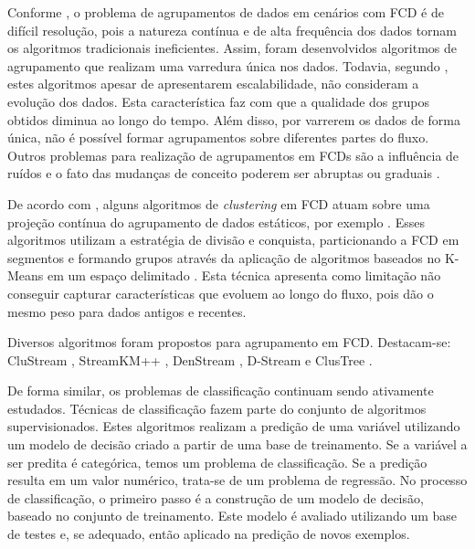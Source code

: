 \documentclass[qual, classic, a4paper]{ufbathesis}
\begin{document}
Conforme \cite{Aggarwal:2003:FCE:1315451.1315460}, o problema de agrupamentos de dados em cenários com FCD é de difícil resolução,
pois a natureza contínua e de alta frequência dos dados tornam os algoritmos tradicionais ineficientes.
Assim, foram desenvolvidos algoritmos de agrupamento que realizam uma varredura única nos dados. 
Todavia, segundo \cite{Aggarwal:2003:FCE:1315451.1315460}, estes algoritmos apesar de apresentarem escalabilidade, 
não consideram a evolução dos dados. 
Esta característica faz com que a qualidade dos grupos obtidos diminua ao longo do tempo.
Além disso, por varrerem os dados de forma única, não é possível formar agrupamentos sobre diferentes partes do fluxo.
Outros problemas para realização de agrupamentos em FCDs são a influência de ruídos e o fato das mudanças de conceito poderem ser abruptas ou graduais \cite{Khalilian:DBLP:journals/corr/abs-1006-5261}.

De acordo com \cite{Chen:Tu}, 
alguns algoritmos de \textit{clustering} em FCD atuam sobre uma projeção contínua do agrupamento de dados estáticos, 
por exemplo \cite{Guha:2003:CDS:776752.776777}.
Esses algoritmos utilizam a estratégia de divisão e conquista, particionando a FCD em segmentos e 
formando grupos através da aplicação de algoritmos baseados no K-Means em um espaço delimitado \cite{Guha:2000:CDS:795666.796588}.
Esta técnica apresenta como limitação não conseguir capturar características que evoluem ao longo do fluxo, 
pois dão o mesmo peso para dados antigos e recentes.
 
Diversos algoritmos foram propostos para agrupamento em FCD. 
Destacam-se: 
CluStream \cite{Aggarwal:2003:FCE:1315451.1315460},
StreamKM++ \cite{Ackermann:2012:SCA:2133803.2184450},
DenStream \cite{Cao:Feng:Ester},
D-Stream \cite{Chen:Tu} e ClusTree \cite{Kranen:2011:CIM:2134350.2134352}.

De forma similar, os problemas de classificação continuam sendo ativamente estudados.
Técnicas de classificação fazem parte do conjunto de algoritmos supervisionados.
Estes algoritmos realizam a predição de uma variável utilizando um modelo de decisão criado a partir de uma base de treinamento.
Se a variável a ser predita é categórica, temos um problema de classificação.
Se a predição resulta em um valor numérico, trata-se de um problema de regressão.
No processo de classificação, o primeiro passo é a construção de um modelo de decisão, baseado no conjunto de treinamento.
Este modelo é avaliado utilizando um base de testes e, se adequado, então aplicado na predição de novos exemplos.
\end{document}
